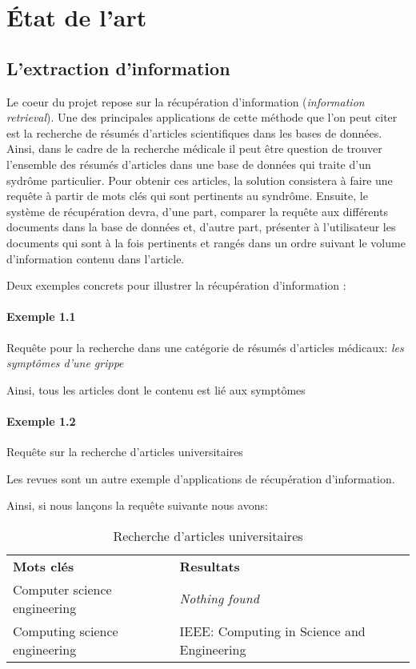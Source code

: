 \section{État de l'art}

\subsection{L'extraction d'information}

Le coeur du projet repose sur la récupération d'information
({\it information retrieval}).
Une des principales applications de cette méthode
que l'on peut citer est la recherche de résumés
d'articles scientifiques dans les bases de données.
Ainsi, dans le cadre de la recherche médicale il peut être
question de trouver l'ensemble des résumés d'articles dans une
base de données qui traite d'un sydrôme particulier.
Pour obtenir ces articles, la solution consistera à faire une requête
à partir de mots clés qui sont pertinents au syndrôme.
Ensuite, le système de récupération devra, d'une part,
comparer la requête aux différents documents dans la base de données
et, d'autre part, présenter à l'utilisateur les documents qui sont
à la fois pertinents et rangés dans un ordre suivant
le volume d'information contenu dans l'article.

Deux exemples concrets pour illustrer la récupération d'information :

\paragraph{Exemple 1.1}
Requête pour la recherche dans une catégorie de résumés
d'articles médicaux: {\it les symptômes d'une grippe}

Ainsi, tous les articles dont le contenu est lié aux symptômes

\paragraph{Exemple 1.2}
Requête sur la recherche d'articles universitaires

Les revues sont un autre exemple d'applications
de récupération d'information.

Ainsi, si nous lançons la requête suivante nous avons:

\begin{table}[!htb]
\begin{center}
\begin{tabular}{l p{6cm}}
\bf Mots clés & \bf Resultats \\
Computer science engineering  & \it Nothing found \\
Computing science engineering
& IEEE: Computing in Science and Engineering
\end{tabular}
\caption{Recherche d'articles universitaires}
\end{center}
\end{table}

